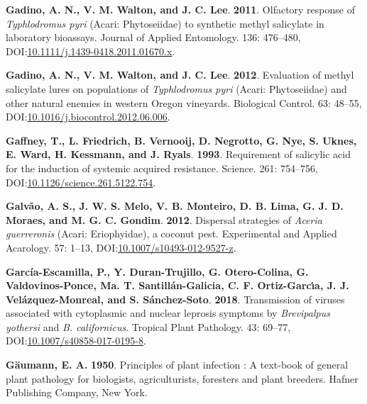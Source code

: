\documentclass[12pt,final,CPage]{ufthesis}
\newlength{\cslhangindent}
\newenvironment{CSLReferences}[2] %
{%
	\setlength{\parindent}{0pt}
	\ifodd #1 \everypar{\setlength{\hangindent}{\cslhangindent}}\ignorespaces\fi
	\ifnum #2 > 0
	\setlength{\parskip}{#2\baselineskip}
	\fi
}%
{}
\begin{document}
{\begin{CSLReferences}{1}{0}
  \leavevmode{}%
  \textbf{Gadino, A. N., V. M. Walton, and J. C. Lee}. \textbf{2011}. Olfactory response of {\emph{Typhlodromus pyri}} {({Acari}: {Phytoseiidae})} to synthetic methyl salicylate in laboratory bioassays. Journal of Applied Entomology. 136: 476--480, DOI:\href{https://doi.org/10.1111/j.1439-0418.2011.01670.x}{10.1111/j.1439-0418.2011.01670.x}.

  \leavevmode{}%
  \textbf{Gadino, A. N., V. M. Walton, and J. C. Lee}. \textbf{2012}. Evaluation of methyl salicylate lures on populations of {\emph{Typhlodromus pyri}} {({Acari}: {Phytoseiidae})} and other natural enemies in western {Oregon} vineyards. Biological Control. 63: 48--55, DOI:\href{https://doi.org/10.1016/j.biocontrol.2012.06.006}{10.1016/j.biocontrol.2012.06.006}.

  \leavevmode{}%
  \textbf{Gaffney, T., L. Friedrich, B. Vernooij, D. Negrotto, G. Nye, S. Uknes, E. Ward, H. Kessmann, and J. Ryals}. \textbf{1993}. Requirement of salicylic acid for the induction of systemic acquired resistance. Science. 261: 754--756, DOI:\href{https://doi.org/10.1126/science.261.5122.754}{10.1126/science.261.5122.754}.

  \leavevmode{}%
  \textbf{Galvão, A. S., J. W. S. Melo, V. B. Monteiro, D. B. Lima, G. J. D. Moraes, and M. G. C. Gondim}. \textbf{2012}. Dispersal strategies of {\emph{Aceria guerreronis}} ({Acari}: {Eriophyidae}), a coconut pest. Experimental and Applied Acarology. 57: 1--13, DOI:\href{https://doi.org/10.1007/s10493-012-9527-z}{10.1007/s10493-012-9527-z}.

  \leavevmode{}%
  \textbf{García-Escamilla, P., Y. Duran-Trujillo, G. Otero-Colina, G. Valdovinos-Ponce, Ma. T. Santillán-Galicia, C. F. Ortiz-Garcı́a, J. J. Velázquez-Monreal, and S. Sánchez-Soto}. \textbf{2018}. Transmission of viruses associated with cytoplasmic and nuclear leprosis symptoms by {\emph{Brevipalpus yothersi}} and {\emph{B. californicus}}. Tropical Plant Pathology. 43: 69--77, DOI:\href{https://doi.org/10.1007/s40858-017-0195-8}{10.1007/s40858-017-0195-8}.

  \leavevmode{}%
  \textbf{Gäumann, E. A.} \textbf{1950}. Principles of plant infection : A text-book of general plant pathology for biologists, agriculturists, foresters and plant breeders. Hafner Publishing Company, New York.


\end{CSLReferences}}
\end{document}

